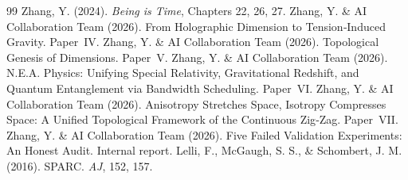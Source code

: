 \documentclass[12pt,a4paper]{article}
\begin{document}
\begin{thebibliography}{99}
 Zhang, Y. (2024). \textit{Being is Time}, Chapters 22, 26, 27.
 Zhang, Y. \& AI Collaboration Team (2026). From Holographic Dimension to Tension‑Induced Gravity. Paper~IV.
 Zhang, Y. \& AI Collaboration Team (2026). Topological Genesis of Dimensions. Paper~V.
 Zhang, Y. \& AI Collaboration Team (2026). N.E.A. Physics: Unifying Special Relativity, Gravitational Redshift, and Quantum Entanglement via Bandwidth Scheduling. Paper~VI.
 Zhang, Y. \& AI Collaboration Team (2026). Anisotropy Stretches Space, Isotropy Compresses Space: A Unified Topological Framework of the Continuous Zig‑Zag. Paper~VII.
 Zhang, Y. \& AI Collaboration Team (2026). Five Failed Validation Experiments: An Honest Audit. Internal report.
 Lelli, F., McGaugh, S. S., \& Schombert, J. M. (2016). SPARC. \textit{AJ}, 152, 157.
\end{thebibliography}
\end{document}
